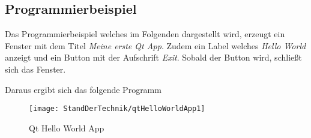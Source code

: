 \subsection{Programmierbeispiel}
\label{subsec:programmierbeispiel}
Das Programmierbeispiel welches im Folgenden dargestellt wird, erzeugt ein Fenster mit dem Titel 
\emph{Meine erste Qt App}. Zudem ein Label welches \emph{Hello World} anzeigt und ein Button mit der
Aufschrift \emph{Exit}. Sobald der Button wird, schließt sich das Fenster.



Daraus ergibt sich das folgende Programm
\begin{figure}[h]
    \centering
    \texttt{[image: StandDerTechnik/qtHelloWorldApp1]}
    \caption[Qt Hello World App]{Qt Hello World App}
    \label{img:qtHelloWorldApp}
\end{figure}